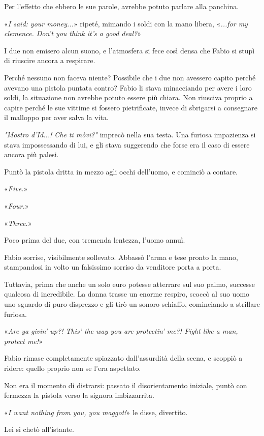 Per l'effetto che ebbero le sue parole, avrebbe potuto parlare alla panchina.

«\emph{I said: your money...}» ripeté, mimando i soldi con la mano libera, «\emph{...for my clemence. Don't you think it's a good deal?}»

I due non emisero alcun suono, e l'atmosfera si fece così densa che Fabio si stupì di riuscire ancora a respirare.

Perché nessuno non faceva niente? Possibile che i due non avessero capito perché avevano una pistola puntata contro? Fabio li stava minacciando per avere i loro soldi, la situazione non avrebbe potuto essere più chiara. Non riusciva proprio a capire perché le sue vittime si fossero pietrificate, invece di sbrigarsi a consegnare il malloppo per aver salva la vita.

\emph{"Mostro d'Id...! Che ti mòvi?"} imprecò nella sua testa. Una furiosa impazienza si stava impossessando di lui, e gli stava suggerendo che forse era il caso di essere ancora più palesi.

Puntò la pistola dritta in mezzo agli occhi dell'uomo, e cominciò a contare.

«\emph{Five.}»

«\emph{Four.}»

«\emph{Three.}»

Poco prima del due, con tremenda lentezza, l'uomo annuì.

Fabio sorrise, visibilmente sollevato. Abbassò l'arma e tese pronto la mano, stampandosi in volto un falsissimo sorriso da venditore porta a porta.

Tuttavia, prima che anche un solo euro potesse atterrare sul suo palmo, successe qualcosa di incredibile. La donna trasse un enorme respiro, scoccò al suo uomo uno sguardo di puro disprezzo e gli tirò un sonoro schiaffo, cominciando a strillare furiosa.

«\emph{Are ya givin' up?! This' the way you are protectin' me?! Fight like a man, protect me!}»

Fabio rimase completamente spiazzato dall'assurdità della scena, e scoppiò a ridere: quello proprio non se l'era aspettato.

Non era il momento di distrarsi: passato il disorientamento iniziale, puntò con fermezza la pistola verso la signora imbizzarrita.

«\emph{I want nothing from you, you maggot!}» le disse, divertito.

Lei si chetò all'istante.

